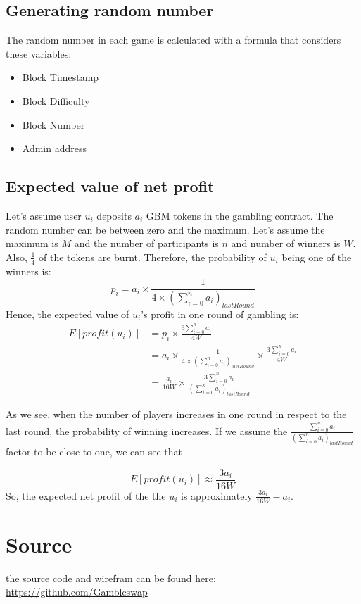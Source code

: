 \documentclass{article}
\begin{document}
\subsection{Generating random number}
The random number in each game is calculated with a formula that considers these variables:
\begin{itemize}
    \item Block Timestamp
    \item Block Difficulty
    \item Block Number
    \item Admin address
\end{itemize}

\subsection{Expected value of net profit}

Let's assume user $u_i$ deposits $a_i$ GBM tokens in the gambling contract. The random number can be between zero and the maximum. Let's assume the maximum is $M$ and the number of participants is $n$ and number of winners is $W$. Also, $\frac{1}{4}$ of the tokens are burnt.
Therefore, the probability of $u_i$ being one of the winners is:
\begin{equation*}
    p_i = a_i \times \frac{1}{4\times (\sum_{i = 0}^{n} a_i)_{lastRound}}
\end{equation*}
Hence, the expected value of $u_i$'s profit in one round of gambling is:
\begin{align*}
    E[profit(u_i)] &= p_i \times \frac{3\sum_{i=0}^{n}a_i}{4W} \\
    &=
    a_i \times \frac{1}{4\times (\sum_{i = 0}^{n} a_i)_{lastRound}} \times 
    \frac{3\sum_{i=0}^{n}a_i}{4W} \\
    &= 
    \frac{a_i}{16 W} \times \frac{3\sum_{i=0}^{n} a_i}{(\sum_{i=0}^{n} a_i)_{lastRound}}
\end{align*}

As we see, when the number of players increases in one round in respect to the last round, the probability of winning increases. If we assume the 
$\frac{\sum_{i=0}^{n} a_i}{(\sum_{i=0}^{n} a_i)_{lastRound}}$ factor to be close to one, we can see that 

$$
E[profit(u_i)] \approx \frac{3a_i}{16W}
$$
So, the expected net profit of the the $u_i$ is approximately
$
\frac{3a_i}{16W} - a_i
$.


\section{Source}
the source code and wirefram can be found here:
\href{https://github.com/Gambleswap}{https://github.com/Gambleswap}
\end{document}
